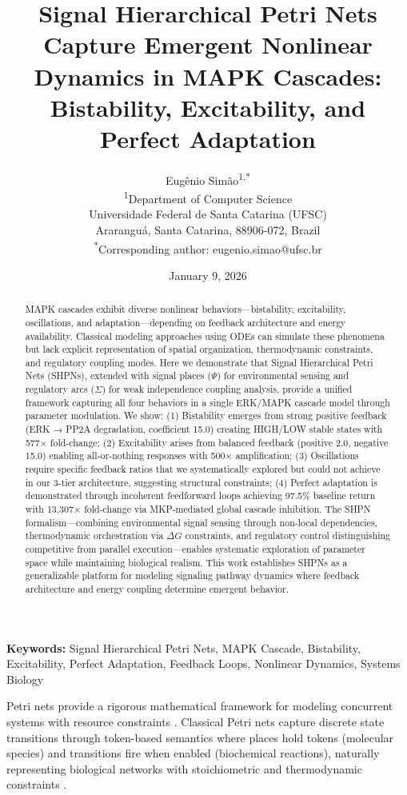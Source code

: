 \documentclass[twocolumn,11pt]{article}
\title{\textbf{Signal Hierarchical Petri Nets Capture Emergent Nonlinear Dynamics in MAPK Cascades: Bistability, Excitability, and Perfect Adaptation}}
\author{
Eugênio Simão\textsuperscript{1,*}\\
\textsuperscript{1}Department of Computer Science\\
Universidade Federal de Santa Catarina (UFSC)\\
Araranguá, Santa Catarina, 88906-072, Brazil\\
\textsuperscript{*}Corresponding author: eugenio.simao@ufsc.br
}
\date{January 9, 2026}
\begin{document}
\maketitle

\begin{abstract}
MAPK cascades exhibit diverse nonlinear behaviors—bistability, excitability, oscillations, and adaptation—depending on feedback architecture and energy availability. Classical modeling approaches using ODEs can simulate these phenomena but lack explicit representation of spatial organization, thermodynamic constraints, and regulatory coupling modes. Here we demonstrate that Signal Hierarchical Petri Nets (SHPNs), extended with signal places ($\Psi$) for environmental sensing and regulatory arcs ($\Sigma$) for weak independence coupling analysis, provide a unified framework capturing all four behaviors in a single ERK/MAPK cascade model through parameter modulation. We show: (1) Bistability emerges from strong positive feedback (ERK → PP2A degradation, coefficient 15.0) creating HIGH/LOW stable states with 577× fold-change; (2) Excitability arises from balanced feedback (positive 2.0, negative 15.0) enabling all-or-nothing responses with 500× amplification; (3) Oscillations require specific feedback ratios that we systematically explored but could not achieve in our 3-tier architecture, suggesting structural constraints; (4) Perfect adaptation is demonstrated through incoherent feedforward loops achieving 97.5\% baseline return with 13,307× fold-change via MKP-mediated global cascade inhibition. The SHPN formalism—combining environmental signal sensing through non-local dependencies, thermodynamic orchestration via $\Delta G$ constraints, and regulatory control distinguishing competitive from parallel execution—enables systematic exploration of parameter space while maintaining biological realism. This work establishes SHPNs as a generalizable platform for modeling signaling pathway dynamics where feedback architecture and energy coupling determine emergent behavior.
\end{abstract}

\textbf{Keywords:} Signal Hierarchical Petri Nets, MAPK Cascade, Bistability, Excitability, Perfect Adaptation, Feedback Loops, Nonlinear Dynamics, Systems Biology

Petri nets provide a rigorous mathematical framework for modeling concurrent systems with resource constraints \citep{petri1962, chaouiya2007}. Classical Petri nets capture discrete state transitions through token-based semantics where places hold tokens (molecular species) and transitions fire when enabled (biochemical reactions), naturally representing biological networks with stoichiometric and thermodynamic constraints \citep{heiner2008}.
\end{document}
